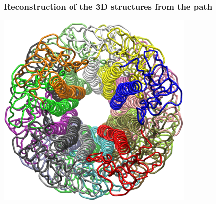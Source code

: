 \begin{frame}
    \frametitle{Reconstruction of the 3D structures from the path}
    \begin{center}
        \href{run:figures/movieS2.avi}{
            \includegraphics[width=.5\textwidth]{figures/pilus_00000.png}
        }
    \end{center}
\end{frame}
